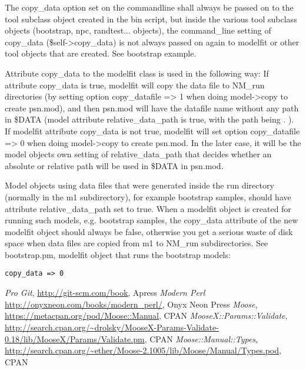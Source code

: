 The copy\_data option set on the commandline shall always be passed on to the 
tool subclass object created in the bin script, but inside the various tool subclass objects (bootstrap, npc, randtest... objects),
the command\_line setting of copy\_data (\$self->copy\_data) is not always passed on again to modelfit or other tool objects
that are created. See bootstrap example.

Attribute copy\_data to the modelfit class is used in the following way:
If attribute copy\_data is true, modelfit will copy the data file
to NM\_run directories (by setting option copy\_datafile => 1 when doing model->copy to create psn.mod),
and then psn.mod will have the datafile name without any path in \$DATA (model attribute relative\_data\_path is true, with
the path being . ). If modelfit attribute copy\_data is not true, 
modelfit will set option copy\_datafile => 0 when doing model->copy to create psn.mod.
In the later case, it will be the model objects own setting of relative\_data\_path that decides
whether an absolute or relative path will be used in \$DATA in psn.mod.

Model objects using data files that were generated inside the run directory (normally in the m1 subdirectory), 
for example bootstrap samples, should have attribute relative\_data\_path set to true.
When a modelfit object is created for running such models, e.g. bootstrap samples,
the copy\_data attribute of the new modelfit object should always be false, otherwise you get a serious waste of disk space
when data files are copied from m1 to NM\_run subdirectories.
See bootstrap.pm, modelfit object that runs the bootstrap models:
\begin{verbatim}
copy_data => 0
\end{verbatim}


\begin{thebibliography}{1}
	 {\em Pro Git}, \url{http://git-scm.com/book}, Apress
	 {\em Modern Perl} \url{http://onyxneon.com/books/modern_perl/}, Onyx Neon Press
	 {\em Moose}, \url{https://metacpan.org/pod/Moose::Manual}, CPAN
	 {\em MooseX::Params::Validate}, \url{http://search.cpan.org/\~drolsky/MooseX-Params-Validate-0.18/lib/MooseX/Params/Validate.pm}, CPAN
	 {\em Moose::Manual::Types}, \url{http://search.cpan.org/~ether/Moose-2.1005/lib/Moose/Manual/Types.pod}, CPAN
\end{thebibliography}



